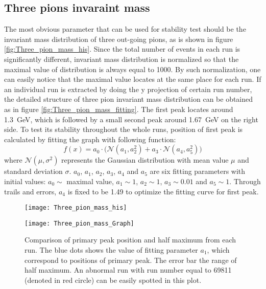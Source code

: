 \subsection{Three pions invaraint mass}
The most obvious parameter that can be used for stability test should be the invariant mass distribution of three out-going pions, as is shown in figure \ref{fig:Three_pion_mass_his}. Since the total number of events in each run is significantly different, invariant mass distribution is normalized so that the maximal value of distribution is always equal to 1000. By such normalization, one can easily notice that the maximal value locates at the same place for each run. If an individual run is extracted by doing the y projection of certain run number, the detailed structure of three pion invariant mass distribution can be obtained as in figure \ref{fig:Three_pion_mass_fitting}. The first peak locates around \SI{1.3}{\giga\electronvolt}, which is followed by a small second peak around \SI{1.67}{\giga\electronvolt} on the right side. To test its stability throughout the whole runs, position of first peak is calculated by fitting the graph with following function:
\begin{equation}
f(x) = a_0 \cdot \Big(\mathcal{N}(a_1, a_2^2)+a_3 \cdot \mathcal{N}(a_4, a_5^2)\Big)
\end{equation}
where $\mathcal{N}(\mu,\sigma^2)$ represents the Gaussian distribution with mean value $\mu$ and standard deviation $\sigma$. $a_0$, $a_1$, $a_2$, $a_3$, $a_4$ and $a_5$ are six fitting parameters with initial values: $a_0 \sim$ maximal value, $a_1 \sim 1$, $a_2 \sim 1$, $a_3 \sim 0.01$ and $a_5 \sim 1$. Through trails and errors, $a_4$ is fixed to be 1.49 to optimize the fitting curve for first peak.

\begin{figure*}[!ht]
	\centering
	\vspace{2cm}
	\texttt{[image: Three\_pion\_mass\_his]}
	\caption{Histogram of invariant mass distribution of three pions for each run. The colors inside the histogram represent number of events corresponding to run number and invariant mass. To better compare and conceive the structure of distribution between runs visually, the maximal value of each distribution is normalized to 1000. As one can easily notice that maximal value or peak of distribution locates around \SI{1.3}{\giga\electronvolt} for almost every run.}
	\label{fig:Three_pion_mass_his}
	\vspace{2 cm}
	
	\texttt{[image: Three\_pion\_mass\_Graph]}
	\caption{Comparison of primary peak position and half maximum from each run. The blue dots shows the value of fitting parameter $a_1$, which correspond to positions of primary peak. The error bar the range of half maximum. An abnormal run with run number equal to 69811 (denoted in red circle) can be easily spotted in this plot.}
	\label{fig:Three_pion_mass_Graph}
	\vspace{2cm}
\end{figure*}

